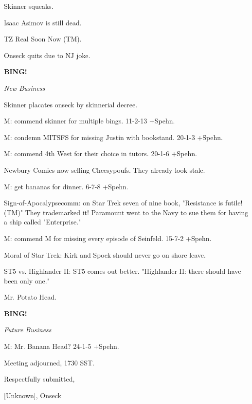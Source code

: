 \documentclass[12pt]{article}
\newcommand{\bing}{{\bf BING!} }
\newcommand{\goto}[1]{\bing \vskip 12pt \centerline{{\em{#1}}}}
\begin{document}
Skinner squeaks.

Isaac Asimov is still dead.

TZ Real Soon Now (TM).

Onseck quits due to NJ joke.

\goto{New Business}

Skinner placates onseck by skinnerial decree.

M: commend skinner for multiple bings. 11-2-13 +Spehn.

M: condemn MITSFS for missing Justin with bookstand. 20-1-3 +Spehn.

M: commend 4th West for their choice in tutors. 20-1-6 +Spehn.

Newbury Comics now selling Cheesypoufs. They already look stale.

M: get bananas for dinner. 6-7-8 +Spehn.

Sign-of-Apocalypsecomm: on Star Trek seven of nine book, "Resistance is futile! (TM)" They trademarked it! Paramount went to the Navy to sue them for having a ship called "Enterprise."

M: commend M for missing every episode of Seinfeld. 15-7-2 +Spehn.

Moral of Star Trek: Kirk and Spock should never go on shore leave.

ST5 vs. Highlander II: ST5 comes out better. "Highlander II: there should have been only one."

Mr. Potato Head.

\goto{Future Business}

M: Mr. Banana Head? 24-1-5 +Spehn.

\vspace{12pt}

\noindent
Meeting adjourned, 1730 SST.

\vspace{18pt}

\centerline{Respectfully submitted,}
\centerline{[Unknown], Onseck}
\end{document}
